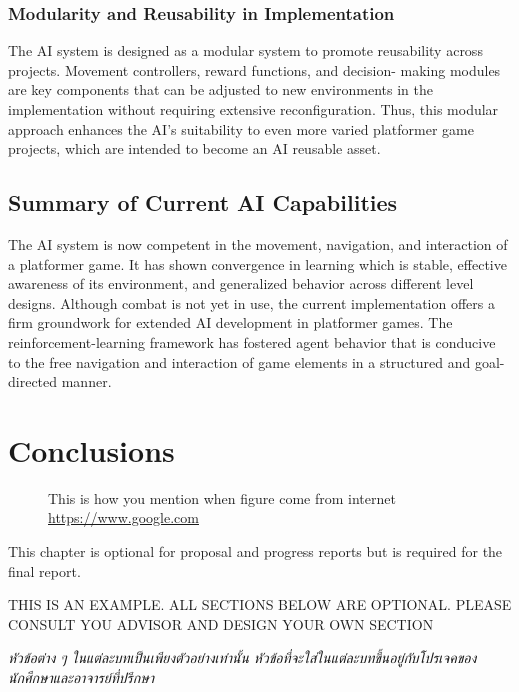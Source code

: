\documentclass[12pt,oneside,openright,a4paper]{cpe-english-project}
\begin{document}
\subsection{Modularity and Reusability in Implementation}
The AI system is designed as a modular system to promote reusability across projects. Movement controllers, reward functions, and decision- making modules are key components that can be adjusted to new environments in the implementation without requiring extensive reconfiguration. Thus, this modular approach enhances the AI's suitability to even more varied platformer game projects, which are intended to become an AI reusable asset.
\section{Summary of Current AI Capabilities}
The AI system is now competent in the movement, navigation, and interaction of a platformer game. It has shown convergence in learning which is stable, effective awareness of its environment, and generalized behavior across different level designs. Although combat is not yet in use, the current implementation offers a firm groundwork for extended AI development in platformer games. The reinforcement-learning framework has fostered agent behavior that is conducive to the free navigation and interaction of game elements in a structured and goal-directed manner.


\chapter{Conclusions}

 \begin{figure}[!h]
\caption{This is how you mention when figure come from internet  \href{https://www.google.com} {https://www.google.com}}\label{fig:x1}
\end{figure}

This chapter is optional for proposal and progress reports but 
is required for the final report.

THIS IS AN EXAMPLE. ALL SECTIONS BELOW ARE OPTIONAL. PLEASE CONSULT YOU ADVISOR AND DESIGN YOUR OWN SECTION

\emph{\textthai{หัวข้อต่าง ๆ ในแต่ละบทเป็นเพียงตัวอย่างเท่านั้น หัวข้อที่จะใส่ในแต่ละบทขึ้นอยู่กับโปรเจคของนักศึกษาและอาจารย์ที่ปรึกษา}}
\end{document}
